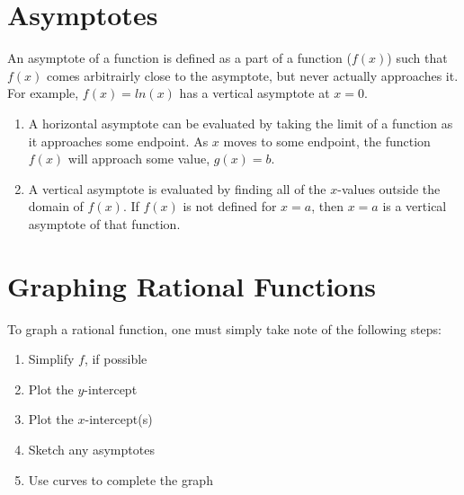 \section{Asymptotes}
An asymptote of a function is defined as a part of a function ($f(x)$) such that
$f(x)$ comes arbitrairly close to the asymptote, but never actually approaches
it.  For example, $f(x)=ln(x)$ has a vertical asymptote at $x=0$.


\begin{enumerate}
  \item{A horizontal asymptote can be evaluated by taking the limit of a
      function as it approaches some endpoint.  As $x$ moves to some endpoint,
    the function $f(x)$ will approach some value, $g(x)=b$.}
  \item{A vertical asymptote is evaluated by finding all of the $x$-values
      outside the domain of $f(x)$.  If $f(x)$ is not defined for $x=a$, then
      $x=a$ is a vertical asymptote of that function.}
\end{enumerate}

\section{Graphing Rational Functions}
To graph a rational function, one must simply take note of the following steps:
\begin{enumerate}
  \item{Simplify $f$, if possible}
  \item{Plot the $y$-intercept}
  \item{Plot the $x$-intercept(s)}
  \item{Sketch any asymptotes}
  \item{Use curves to complete the graph}
\end{enumerate}
